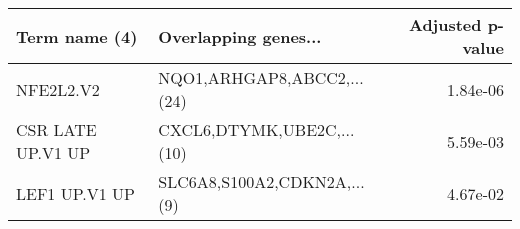 \begin{tabular}{llr}
\toprule
    Term name (4) &        Overlapping genes... &  Adjusted p-value \\
\midrule
        NFE2L2.V2 &  NQO1,ARHGAP8,ABCC2,...(24) &          1.84e-06 \\
CSR LATE UP.V1 UP &   CXCL6,DTYMK,UBE2C,...(10) &          5.59e-03 \\
    LEF1 UP.V1 UP & SLC6A8,S100A2,CDKN2A,...(9) &          4.67e-02 \\
\bottomrule
\end{tabular}
